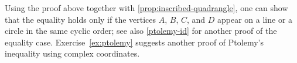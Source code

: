 Using the proof above together with \ref{prop:inscribed-quadrangle}, one can show that the equality holds only if the vertices $A$, $B$, $C$, and $D$ appear on a line or a circle in the same cyclic order;
see also \ref{ptolemy-id} for another proof of the equality case.
Exercise~\ref{ex:ptolemy} suggests another proof of Ptolemy's inequality using complex coordinates.
